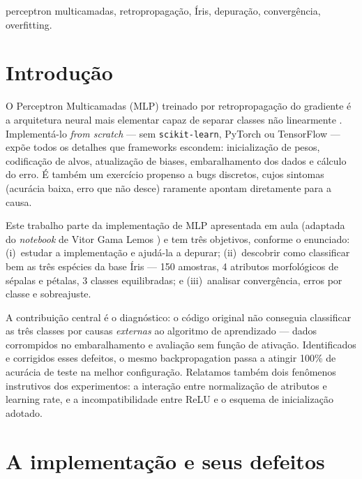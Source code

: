 \documentclass[conference]{IEEEtran}
\begin{document}
\begin{IEEEkeywords}
perceptron multicamadas, retropropagação, Íris, depuração, convergência, overfitting.
\end{IEEEkeywords}

\section{Introdução}

O Perceptron Multicamadas (MLP) treinado por retropropagação do gradiente é a arquitetura neural mais elementar capaz de separar classes não linearmente \cite{haykin2009}. Implementá-lo \emph{from scratch} --- sem \texttt{scikit-learn}, PyTorch ou TensorFlow --- expõe todos os detalhes que frameworks escondem: inicialização de pesos, codificação de alvos, atualização de biases, embaralhamento dos dados e cálculo do erro. É também um exercício propenso a bugs discretos, cujos sintomas (acurácia baixa, erro que não desce) raramente apontam diretamente para a causa.

Este trabalho parte da implementação de MLP apresentada em aula (adaptada do \emph{notebook} de Vitor Gama Lemos \cite{lemos2024}) e tem três objetivos, conforme o enunciado: (i)~estudar a implementação e ajudá-la a depurar; (ii)~descobrir como classificar bem as três espécies da base Íris \cite{fisher1936} --- 150 amostras, 4 atributos morfológicos de sépalas e pétalas, 3 classes equilibradas; e (iii)~analisar convergência, erros por classe e sobreajuste.

A contribuição central é o diagnóstico: o código original não conseguia classificar as três classes por causas \emph{externas} ao algoritmo de aprendizado --- dados corrompidos no embaralhamento e avaliação sem função de ativação. Identificados e corrigidos esses defeitos, o mesmo backpropagation passa a atingir 100\% de acurácia de teste na melhor configuração. Relatamos também dois fenômenos instrutivos dos experimentos: a interação entre normalização de atributos e learning rate, e a incompatibilidade entre ReLU e o esquema de inicialização adotado.

\section{A implementação e seus defeitos}
\end{document}
